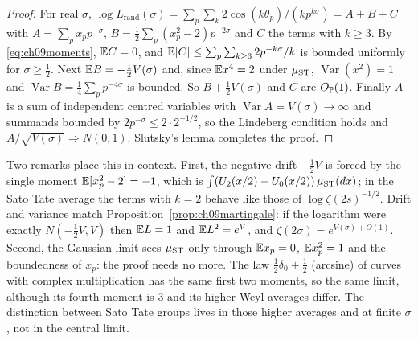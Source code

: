 \begin{proof}
For real $\sigma$, $\log L_{\mathrm{rand}}(\sigma) = \sum_p\sum_k 2\cos(k\theta_p)/(kp^{k\sigma}) = A + B + C$ with $A = \sum_p x_pp^{-\sigma}$, $B = \frac12\sum_p (x_p^2-2)p^{-2\sigma}$ and $C$ the terms with $k\ge3$. By \eqref{eq:ch09moments}, $\mathbb{E} C = 0$, and $\mathbb{E}|C|\le\sum_p\sum_{k\ge3}2p^{-k\sigma}/k$ is bounded uniformly for $\sigma\ge\frac12$. Next $\mathbb{E} B = -\frac12V(\sigma)$ and, since $\mathbb{E} x^4 = 2$ under $\mu_{\mathrm{ST}}$, $\operatorname{Var}(x^2) = 1$ and $\operatorname{Var} B = \frac14\sum_pp^{-4\sigma}$ is bounded. So $B + \frac12V(\sigma)$ and $C$ are $O_{\mathbb{P}}(1)$. Finally $A$ is a sum of independent centred variables with $\operatorname{Var}A = V(\sigma)\to\infty$ and summands bounded by $2p^{-\sigma}\le 2\cdot 2^{-1/2}$, so the Lindeberg condition holds and $A/\sqrt{V(\sigma)}\Rightarrow N(0,1)$. Slutsky's lemma completes the proof.
\end{proof}

Two remarks place this in context. First, the negative drift $-\frac12V$ is forced by the single moment $\mathbb{E}[x_p^2-2]=-1$, which is $\int(U_2(x/2)-U_0(x/2))\,\mu_{\mathrm{ST}}(dx)$; in the Sato Tate average the terms with $k=2$ behave like those of $\log\zeta(2s)^{-1/2}$. Drift and variance match Proposition~\ref{prop:ch09martingale}: if the logarithm were exactly $N(-\frac12V,V)$ then $\mathbb{E} L = 1$ and $\mathbb{E} L^2 = e^V$, and $\zeta(2\sigma) = e^{V(\sigma)+O(1)}$. Second, the Gaussian limit sees $\mu_{\mathrm{ST}}$ only through $\mathbb{E} x_p = 0$, $\mathbb{E} x_p^2 = 1$ and the boundedness of $x_p$: the proof needs no more. The law $\frac12\delta_0+\frac12$ (arcsine) of curves with complex multiplication has the same first two moments, so the same limit, although its fourth moment is $3$ and its higher Weyl averages differ. The distinction between Sato Tate groups lives in those higher averages and at finite $\sigma$, not in the central limit.

